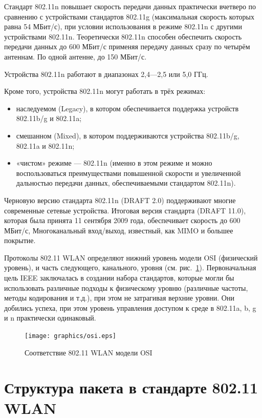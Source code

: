Стандарт 802.11n повышает скорость передачи данных практически вчетверо по
сравнению с устройствами стандартов 802.11g (максимальная скорость которых равна
54 МБит/с), при условии использования в режиме 802.11n с другими устройствами
802.11n. Теоретически 802.11n способен обеспечить скорость передачи данных до
600 МБит/с применяя передачу данных сразу по четырём антеннам. По одной антенне,
до 150 МБит/с.

Устройства 802.11n работают в диапазонах 2,4—2,5 или 5,0 ГГц.

Кроме того, устройства 802.11n могут работать в трёх режимах:

\begin{itemize}
    \item наследуемом (Legacy), в котором обеспечивается поддержка устройств 802.11b/g и 802.11a;
    \item смешанном (Mixed), в котором поддерживаются устройства 802.11b/g, 802.11a и 802.11n;
    \item «чистом» режиме — 802.11n (именно в этом режиме и можно воспользоваться
преимуществами повышенной скорости и увеличенной дальностью передачи данных, обеспечиваемыми стандартом 802.11n).
\end{itemize}

Черновую версию стандарта 802.11n (DRAFT 2.0) поддерживают многие современные
сетевые устройства. Итоговая версия стандарта (DRAFT 11.0), которая была принята
11 сентября 2009 года, обеспечивает скорость до 600 МБит/с, Многоканальный
вход/выход, известный, как MIMO и большее покрытие.

Протоколы 802.11 WLAN определяют нижний уровень модели OSI (физический уровень),
и часть следующего, канального, уровня (см. рис.~\ref{fig:osi}). Первоначальная
цель IEEE заключалась в создании набора стандартов, которые могли бы
использовать различные подходы к физическому уровню (различные частоты, методы
кодирования и т.д.), при этом не затрагивая верхние уровни. Они добились успеха,
при этом уровень управления доступом к среде в 802.11a, b, g и n практически
одинаковый.

\begin{figure}
    \texttt{[image: graphics/osi.eps]}
    \caption{Соответствие 802.11 WLAN модели OSI}
    \label{fig:osi}
\end{figure}

\section{Структура пакета в стандарте 802.11 WLAN}


